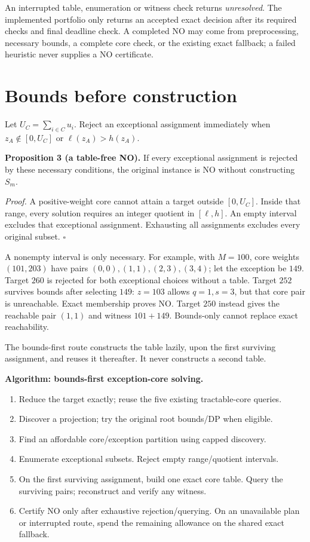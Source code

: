 \documentclass[10pt,english]{article}
\begin{document}
An interrupted table, enumeration or witness check returns \emph{unresolved}. The implemented portfolio only returns an accepted exact decision after its required checks and final deadline check. A completed NO may come from preprocessing, necessary bounds, a complete core check, or the existing exact fallback; a failed heuristic never supplies a NO certificate.

\section{Bounds before construction}
Let $U_C=\sum_{i\in C}u_i$. Reject an exceptional assignment immediately when $z_A\notin[0,U_C]$ or $\ell(z_A)>h(z_A)$.

\textbf{Proposition 3 (a table-free NO).} If every exceptional assignment is rejected by these necessary conditions, the original instance is NO without constructing $S_m$.

\emph{Proof.} A positive-weight core cannot attain a target outside $[0,U_C]$. Inside that range, every solution requires an integer quotient in $[\ell,h]$. An empty interval excludes that exceptional assignment. Exhausting all assignments excludes every original subset. $\square$

A nonempty interval is only necessary. For example, with $M=100$, core weights $(101,203)$ have pairs $(0,0),(1,1),(2,3),(3,4)$; let the exception be $149$. Target $260$ is rejected for both exceptional choices without a table. Target $252$ survives bounds after selecting $149$: $z=103$ allows $q=1,s=3$, but that core pair is unreachable. Exact membership proves NO. Target $250$ instead gives the reachable pair $(1,1)$ and witness $101+149$. Bounds-only cannot replace exact reachability.

The bounds-first route constructs the table lazily, upon the first surviving assignment, and reuses it thereafter. It never constructs a second table.

\begin{tcolorbox}[paperbox]
\textbf{Algorithm: bounds-first exception-core solving.}
\begin{enumerate}
\item Reduce the target exactly; reuse the five existing tractable-core queries.
\item Discover a projection; try the original root bounds/DP when eligible.
\item Find an affordable core/exception partition using capped discovery.
\item Enumerate exceptional subsets. Reject empty range/quotient intervals.
\item On the first surviving assignment, build one exact core table. Query the surviving pairs; reconstruct and verify any witness.
\item Certify NO only after exhaustive rejection/querying. On an unavailable plan or interrupted route, spend the remaining allowance on the shared exact fallback.
\end{enumerate}
\end{tcolorbox}
\end{document}
